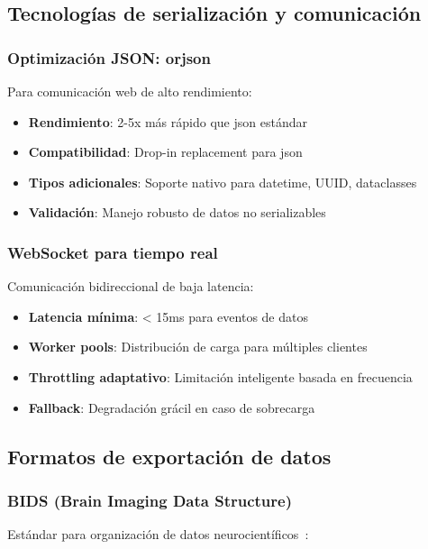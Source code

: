 \subsection{Tecnologías de serialización y comunicación}
\label{subsec:serializacion}

\subsubsection{Optimización JSON: orjson}
Para comunicación web de alto rendimiento:

\begin{itemize}
    \item \textbf{Rendimiento}: 2-5x más rápido que json estándar
    \item \textbf{Compatibilidad}: Drop-in replacement para json
    \item \textbf{Tipos adicionales}: Soporte nativo para datetime, UUID, dataclasses
    \item \textbf{Validación}: Manejo robusto de datos no serializables
\end{itemize}

\subsubsection{WebSocket para tiempo real}
Comunicación bidireccional de baja latencia:

\begin{itemize}
    \item \textbf{Latencia mínima}: < 15ms para eventos de datos
    \item \textbf{Worker pools}: Distribución de carga para múltiples clientes
    \item \textbf{Throttling adaptativo}: Limitación inteligente basada en frecuencia
    \item \textbf{Fallback}: Degradación grácil en caso de sobrecarga
\end{itemize}

\subsection{Formatos de exportación de datos}
\label{subsec:formatos_exportacion}

\subsubsection{BIDS (Brain Imaging Data Structure)}
Estándar para organización de datos neurocientíficos~\cite{bids}:

